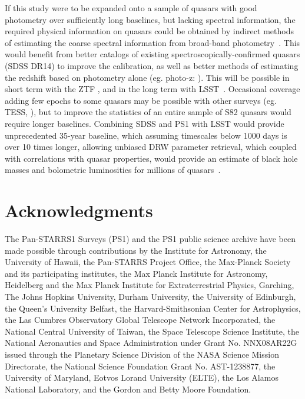 \documentclass[twocolumn]{aastex62}
\begin{document}
If this study were to be expanded onto a sample of quasars with good photometry over sufficiently long baselines, but lacking spectral information, the required physical information on quasars could be obtained by indirect methods of estimating the coarse spectral information from broad-band photometry~\citep{kozlowski2015}. This would benefit from better catalogs of existing spectroscopically-confirmed quasars (SDSS DR14) to improve the calibration, as well as better methods of estimating the redshift based on photometry alone (eg. photo-z: \citealt{jin2019,curran2019,yang2017,richards2015}).  This will be possible in short term with the ZTF \citep{bellm2019}, and in the long term with LSST~\citep{ivezic2019}. Occasional coverage adding few epochs to some quasars may be possible with other surveys (eg. TESS, \citealt{ricker2014}), but to improve the statistics of an entire sample of S82 quasars would require longer baselines. Combining SDSS and PS1 with LSST would provide unprecedented 35-year baseline, which assuming timescales below 1000 days is over 10 times longer, allowing unbiased DRW parameter retrieval, which coupled with correlations with quasar properties, would provide an estimate of black hole masses and bolometric luminosities for millions of quasars~\citep{ivezic2019}. 


\section{Acknowledgments}

The Pan-STARRS1 Surveys (PS1) and the PS1 public science archive have been made possible through contributions by the Institute for Astronomy, the University of Hawaii, the Pan-STARRS Project Office, the Max-Planck Society and its participating institutes, the Max Planck Institute for Astronomy, Heidelberg and the Max Planck Institute for Extraterrestrial Physics, Garching, The Johns Hopkins University, Durham University, the University of Edinburgh, the Queen's University Belfast, the Harvard-Smithsonian Center for Astrophysics, the Las Cumbres Observatory Global Telescope Network Incorporated, the National Central University of Taiwan, the Space Telescope Science Institute, the National Aeronautics and Space Administration under Grant No. NNX08AR22G issued through the Planetary Science Division of the NASA Science Mission Directorate, the National Science Foundation Grant No. AST-1238877, the University of Maryland, Eotvos Lorand University (ELTE), the Los Alamos National Laboratory, and the Gordon and Betty Moore Foundation.
\end{document}
